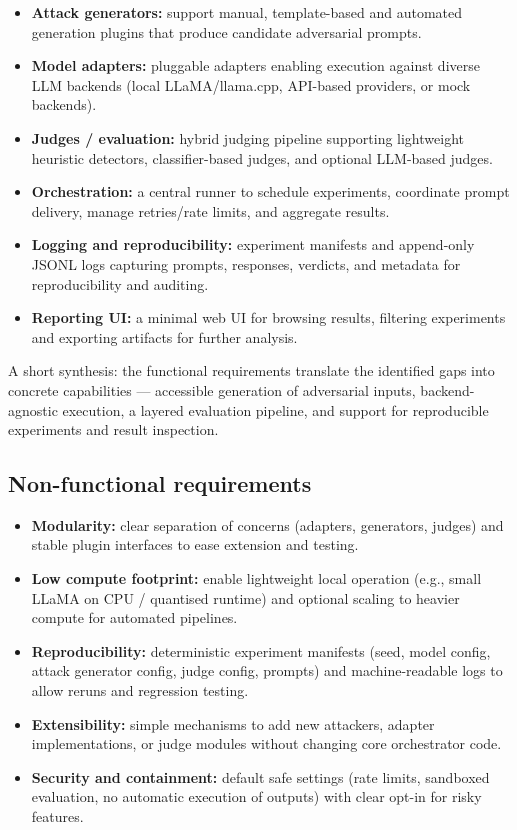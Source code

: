 \begin{itemize}
  \item \textbf{Attack generators:} support manual, template-based and automated generation plugins that produce candidate adversarial prompts.
  \item \textbf{Model adapters:} pluggable adapters enabling execution against diverse LLM backends (local LLaMA/llama.cpp, API-based providers, or mock backends).
  \item \textbf{Judges / evaluation:} hybrid judging pipeline supporting lightweight heuristic detectors, classifier-based judges, and optional LLM-based judges.
  \item \textbf{Orchestration:} a central runner to schedule experiments, coordinate prompt delivery, manage retries/rate limits, and aggregate results.
  \item \textbf{Logging and reproducibility:} experiment manifests and append-only JSONL logs capturing prompts, responses, verdicts, and metadata for reproducibility and auditing.
  \item \textbf{Reporting UI:} a minimal web UI for browsing results, filtering experiments and exporting artifacts for further analysis.
\end{itemize}

A short synthesis: the functional requirements translate the identified gaps into concrete capabilities — accessible generation of adversarial inputs, backend-agnostic execution, a layered evaluation pipeline, and support for reproducible experiments and result inspection.

\subsection{Non-functional requirements}\label{subsec:nonfunctional-reqs}

\begin{itemize}
  \item \textbf{Modularity:} clear separation of concerns (adapters, generators, judges) and stable plugin interfaces to ease extension and testing.
  \item \textbf{Low compute footprint:} enable lightweight local operation (e.g., small LLaMA on CPU / quantised runtime) and optional scaling to heavier compute for automated pipelines.
  \item \textbf{Reproducibility:} deterministic experiment manifests (seed, model config, attack generator config, judge config, prompts) and machine-readable logs to allow reruns and regression testing.
  \item \textbf{Extensibility:} simple mechanisms to add new attackers, adapter implementations, or judge modules without changing core orchestrator code.
  \item \textbf{Security and containment:} default safe settings (rate limits, sandboxed evaluation, no automatic execution of outputs) with clear opt-in for risky features.
\end{itemize}

